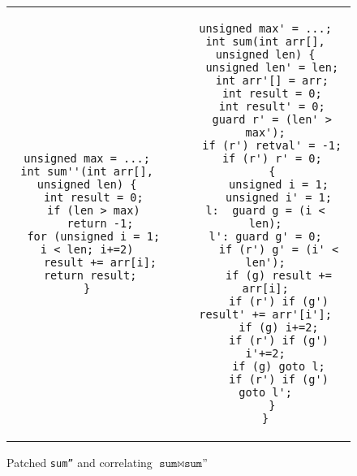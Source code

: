 \begin{figure}
\centering
\begin{tabular}{ccc}
\begin{lstlisting}
unsigned max = ...;
int sum''(int arr[], unsigned len) {
  int result = 0;
  if (len > max)
    return -1;
  for (unsigned i = 1; i < len; i+=2)
    result += arr[i];
 return result;
}
\end{lstlisting}
&
\hspace{0.35in}
&
\begin{lstlisting}
unsigned max' = ...;
int sum(int arr[], unsigned len) {
  unsigned len' = len;
  int arr'[] = arr;
  int result = 0;
  int result' = 0;
  guard r' = (len' > max');
  if (r') retval' = -1;
  if (r') r' = 0;
  {
    unsigned i = 1;
    unsigned i' = 1;
l:  guard g = (i < len);
l': guard g' = 0;
    if (r') g' = (i' < len');
    if (g) result += arr[i];
    if (r') if (g') result' += arr'[i'];
    if (g) i+=2;
    if (r') if (g') i'+=2;
    if (g) goto l;
    if (r') if (g') goto l';
  }
}
\end{lstlisting}
\end{tabular}
\caption{Patched \texttt{sum''} and correlating $ \texttt{sum} \bowtie \texttt{sum''}$}
\end{figure} 